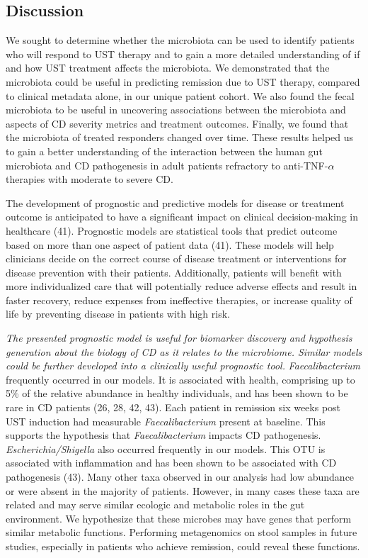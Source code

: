 \documentclass[12pt,]{article}
\begin{document}
\subsection{Discussion}\label{discussion}

We sought to determine whether the microbiota can be used to identify
patients who will respond to UST therapy and to gain a more detailed
understanding of if and how UST treatment affects the microbiota. We
demonstrated that the microbiota could be useful in predicting remission
due to UST therapy, compared to clinical metadata alone, in our unique
patient cohort. We also found the fecal microbiota to be useful in
uncovering associations between the microbiota and aspects of CD
severity metrics and treatment outcomes. Finally, we found that the
microbiota of treated responders changed over time. These results helped
us to gain a better understanding of the interaction between the human
gut microbiota and CD pathogenesis in adult patients refractory to
anti-TNF-\({\alpha}\) therapies with moderate to severe CD.

The development of prognostic and predictive models for disease or
treatment outcome is anticipated to have a significant impact on
clinical decision-making in healthcare (41). Prognostic models are
statistical tools that predict outcome based on more than one aspect of
patient data (41). These models will help clinicians decide on the
correct course of disease treatment or interventions for disease
prevention with their patients. Additionally, patients will benefit with
more individualized care that will potentially reduce adverse effects
and result in faster recovery, reduce expenses from ineffective
therapies, or increase quality of life by preventing disease in patients
with high risk.

\emph{The presented prognostic model is useful for biomarker discovery
and hypothesis generation about the biology of CD as it relates to the
microbiome. Similar models could be further developed into a clinically
useful prognostic tool.} \emph{Faecalibacterium} frequently occurred in
our models. It is associated with health, comprising up to 5\% of the
relative abundance in healthy individuals, and has been shown to be rare
in CD patients (26, 28, 42, 43). Each patient in remission six weeks
post UST induction had measurable \emph{Faecalibacterium} present at
baseline. This supports the hypothesis that \emph{Faecalibacterium}
impacts CD pathogenesis. \emph{Escherichia/Shigella} also occurred
frequently in our models. This OTU is associated with inflammation and
has been shown to be associated with CD pathogenesis (43). Many other
taxa observed in our analysis had low abundance or were absent in the
majority of patients. However, in many cases these taxa are related and
may serve similar ecologic and metabolic roles in the gut environment.
We hypothesize that these microbes may have genes that perform similar
metabolic functions. Performing metagenomics on stool samples in future
studies, especially in patients who achieve remission, could reveal
these functions.
\end{document}

